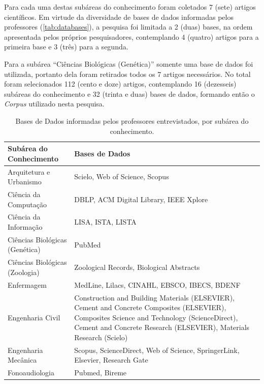 Para cada uma destas subáreas do conhecimento foram coletados 7 (sete) artigos científicos. Em virtude da diversidade de bases de dados informadas pelos professores (\autoref{tab:databases}), a pesquisa foi limitada a 2 (duas) bases, na ordem apresentada pelos próprios pesquisadores, contemplando 4 (quatro) artigos para a primeira base e 3 (três) para a segunda. 

Para a subárea ``Ciências Biológicas (Genética)'' somente uma base de dados foi utilizada, portanto dela foram retirados todos os 7 artigos necessários. No total foram selecionados 112 (cento e doze) artigos, contemplando 16 (dezesseis) subáreas do conhecimento e 32 (trinta e duas) bases de dados, formando então o \emph{Corpus} utilizado nesta pesquisa.

\begin{table}
    \caption{Bases de Dados informadas pelos professores entrevistados, por subárea do conhecimento.}
    \begin{center}
        \begin{tabular}{|p{6cm}|p{8cm}|}
            \hline 
            \textbf{Subárea do Conhecimento} & \textbf{Bases de Dados} \\ 
            \hline 
            Arquitetura e Urbanismo & Scielo, Web of Science, Scopus \\
            \hline
            Ciência da Computação & DBLP, ACM Digital Library, IEEE Xplore \\
            \hline
            Ciência da Informação & LISA, ISTA, LISTA \\
            \hline
            Ciências Biológicas (Genética) & PubMed \\
            \hline
            Ciências Biológicas (Zoologia) & Zoological Records, Biological Abstracts \\
            \hline
            Enfermagem & MedLine, Lilacs, CINAHL, EBSCO, IBECS, BDENF \\
            \hline
            Engenharia Civil & Construction and Building Materials (ELSEVIER), Cement and Concrete Composites (ELSEVIER), Composites Science and Technology (ScienceDirect), Cement and Concrete Research (ELSEVIER), Materials Research (Scielo) \\
            \hline
            Engenharia Mecânica & Scopus, ScienceDirect, Web of Science, SpringerLink, Elsevier, Research Gate \\
            \hline
            Fonoaudiologia & Pubmed, Bireme \\
            \hline

\end{tabular}
\end{center}
\end{table}
